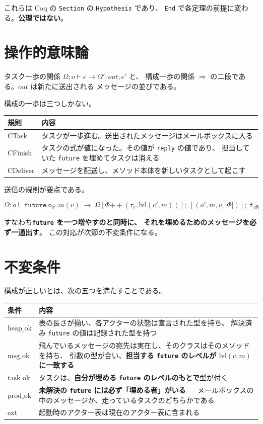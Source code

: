 \documentclass[11pt,a4paper]{ltjsarticle}
\theoremstyle{definition}
\theoremstyle{remark}
\newcommand{\Om}{\Omega}
\newcommand{\Ph}{\Phi}
\newcommand{\heapok}{\mathrm{heap\_ok}}
\newcommand{\msgok}{\mathrm{msg\_ok}}
\newcommand{\taskok}{\mathrm{task\_ok}}
\newcommand{\cstep}{\Longrightarrow}
\newcommand{\lvl}{\mathrm{lvl}}
\newcommand{\prodok}{\mathrm{prod\_ok}}
\begin{document}
これらは Coq の \texttt{Section} の \texttt{Hypothesis} であり、
\texttt{End} で各定理の前提に変わる。\textbf{公理ではない}。

\section{操作的意味論}

タスク一歩の関係 $\Om; o \vdash e \to \Om'; \mathit{out}; e'$ と、
構成一歩の関係 $\cstep$ の二段である。$\mathit{out}$ は新たに送出される
メッセージの並びである。

構成の一歩は三つしかない。

\begin{center}
\small
\begin{tabular}{@{}lp{8.8cm}@{}}
\toprule
規則 & 内容 \\
\midrule
CTask & タスクが一歩進む。送出されたメッセージはメールボックスに入る \\
CFinish & タスクの式が値になった。その値が \texttt{reply} の値であり、
  担当していた \texttt{future} を埋めてタスクは消える \\
CDeliver & メッセージを配送し、メソッド本体を新しいタスクとして起こす \\
\bottomrule
\end{tabular}
\end{center}

送信の規則が要点である。

\[
\Om; o \vdash \mathtt{future}\ \mathtt{o}_{o'}.m(v)
\;\to\;
\Om[\Ph \mathbin{+\!\!+} (\tau_r, \lvl(c',m))];\;
[(o', m, v, |\Ph|)];\;
\mathtt{f}_{|\Ph|}
\]

すなわち\textbf{\texttt{future} を一つ増やすのと同時に、
それを埋めるためのメッセージを必ず一通出す}。
この対応が次節の不変条件になる。

\section{不変条件}
\label{sec:inv}

構成が正しいとは、次の五つを満たすことである。

\begin{center}
\small
\begin{tabular}{@{}lp{8.6cm}@{}}
\toprule
条件 & 内容 \\
\midrule
$\heapok$ & 表の長さが揃い、各アクターの状態は宣言された型を持ち、
  解決済み \texttt{future} の値は記録された型を持つ \\
$\msgok$ & 飛んでいるメッセージの宛先は実在し、そのクラスはそのメソッドを持ち、
  引数の型が合い、\textbf{担当する \texttt{future} のレベルが $\lvl(c,m)$ に一致する} \\
$\taskok$ & タスクは、\textbf{自分が埋める \texttt{future} のレベルのもとで}型が付く \\
$\prodok$ & \textbf{未解決の \texttt{future} には必ず「埋める者」がいる} ---
  メールボックスの中のメッセージか、走っているタスクのどちらかである \\
$\mathrm{ext}$ & 起動時のアクター表は現在のアクター表に含まれる \\
\bottomrule
\end{tabular}
\end{center}
\end{document}
